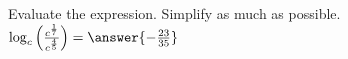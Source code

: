 \documentclass{ximera}
\author{David Kish}
\begin{document}
\begin{exercise}
Evaluate the expression. Simplify as much as possible.\\
$\log_c \left(\frac{c^{\frac{1}{7}}}{c^{\frac{4}{5}}}\right)= \answer{-\frac{23}{35}}$
\end{exercise}
\end{document}
